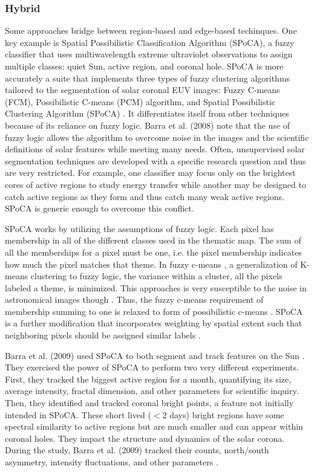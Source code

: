 \documentclass[twoside]{report}
\begin{document}
\subsubsection{Hybrid}\label{sec:hybridspoca}
Some approaches bridge between region-based and edge-based techinques. One key example is Spatial Possibilistic Classification Algorithm (SPoCA), a fuzzy classifier that uses multiwavelength extreme ultraviolet observations to assign multiple classes: quiet Sun, active region, and coronal hole. SPoCA is more accurately a suite that implements three types of fuzzy clustering algorithms tailored to the segmentation of solar coronal EUV images: Fuzzy C-means (FCM),  Possibilistic C-means (PCM) algorithm, and Spatial Possibilistic Clustering Algorithm (SPoCA) \cite{verbeeck2014spoca}. It differentiates itself from other techniques because of its reliance on fuzzy logic. Barra et al. (2008) note that the use of fuzzy logic allows the algorithm to overcome noise in the images and the scientific definitions of solar features while meeting many needs. Often, unsupervised solar segmentation techniques are developed with a specific research question and thus are very restricted. For example, one classifier may focus only on the brightest cores of active regions to study energy transfer while another may be designed to catch active regions as they form and thus catch many weak active regions. SPoCA is generic enough to overcome this conflict.

SPoCA works by utilizing the assumptions of fuzzy logic. Each pixel has membership in all of the different classes used in the thematic map. The sum of all the memberships for a pixel must be one, i.e. the pixel membership indicates how much the pixel matches that theme. In fuzzy c-means \cite{cmeans}, a generalization of K-means clustering to fuzzy logic, the variance within a cluster, all the pixels labeled a theme, is minimized. This approaches is very susceptible to the noise in astronomical images though \cite{krishnapuram1993possibilistic}. Thus, the fuzzy c-means requirement of membership summing to one is relaxed to form of possibilistic c-means \cite{krishnapuram1996possibilistic}. SPoCA is a further modification that incorporates weighting by spatial extent such that neighboring pixels should be assigned similar labels \cite{barra:2008, barra:2009}. 

Barra et al. (2009) used SPoCA to both segment and track features on the Sun \cite{barra:2009}. They exercised the power of SPoCA to perform two very different experiments. First, they tracked the biggest active region for a month, quantifying its size, average intensity, fractal dimension, and other parameters for scientific inquiry. Then, they identified and tracked coronal bright points, a feature not initially intended in SPoCA. These short lived ($< 2$ days) bright regions have some spectral similarity to active regions but are much smaller and can appear within coronal holes. They impact the structure and dynamics of the solar corona. During the study, Barra et al. (2009) tracked their counts, north/south asymmetry, intensity fluctuations, and other parameters \cite{barra:2009}.  
\end{document}
